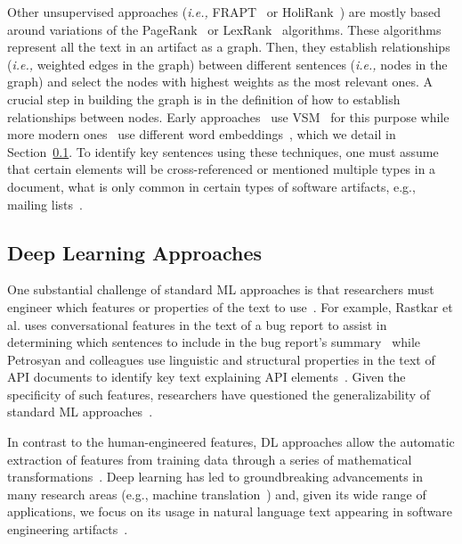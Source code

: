 Other unsupervised approaches 
(\textit{i.e.,} {\small FRAPT}~\cite{Jiang2017} or HoliRank~\cite{Ponzanelli2015, Ponzanelli2017})
are mostly based around variations of the PageRank~\cite{Page1999} or LexRank~\cite{Erkan2004} algorithms. 
These algorithms represent all the text in an artifact as a graph.
Then, they establish relationships (\textit{i.e.,} weighted edges in the graph) 
between different sentences (\textit{i.e.,} nodes in the graph) 
and select the nodes with highest weights as the most relevant ones.
A crucial step in building the graph is in the definition of 
how to establish  relationships between nodes.
Early approaches~\cite{Lotufo2012, Jiang2017} 
use \ac{VSM}~\cite{Salton1975vsm} 
for this purpose while more modern ones~\cite{Huang2018, silva2019}
use different word embeddings~\cite{Mikolov2013, bojanowski2017FastText},
which we detail in Section~\ref{cp2:deep-learning}.
To identify key sentences using these techniques, one must 
assume that certain elements will be cross-referenced 
or mentioned multiple types in a document, 
what is only common in certain types of software artifacts, e.g., mailing lists~\cite{Bacchelli2012}.








\subsection{Deep Learning Approaches}
\label{cp2:deep-learning}



One substantial challenge of standard \acf{ML}
approaches is that researchers must engineer which 
features or properties of the text to use~\cite{ferreira2021}.
For example, Rastkar et al. uses conversational features in 
the text of a bug report to assist in determining which sentences 
to include in the bug report's summary~\cite{Rastkar2010}
while Petrosyan and colleagues use 
linguistic and structural properties 
in the text of API documents to identify key text 
explaining API elements~\cite{Petrosyan2015}.
Given the specificity of such features, 
researchers have questioned the generalizability
of standard \acs{ML} approaches~\cite{Xiao2018, fucci2019}.



In contrast to the human-engineered features,
\acf{DL} approaches allow the automatic extraction of features 
from training data through a series of mathematical transformations~\cite{Deng2018, zhang2021deep}.
Deep learning has led to groundbreaking advancements in many 
research areas (e.g., machine translation~\cite{lopez2008translation}) 
and, given its wide range of applications, 
we focus
on its usage in natural language text appearing in software engineering artifacts~\cite{ferreira2021, li2018deep, watson2022}.









